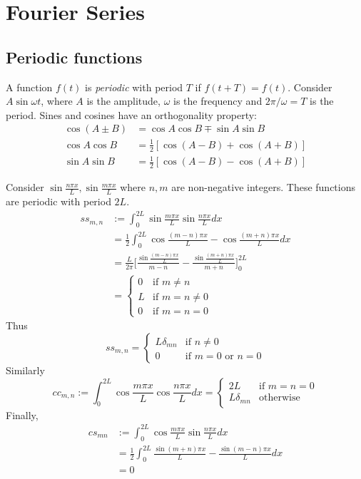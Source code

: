 \documentclass[a4paper]{article}
\begin{document}


\tableofcontents


\section{Fourier Series}

\subsection{Periodic functions}

A function $f(t)$ is \emph{periodic} with period $T$ if $f(t+T) = f(t)$. Consider $A \sin\omega t$, where $A$ is the amplitude, $\omega$ is the frequency and $2\pi/\omega=T$ is the period. Sines and cosines have an orthogonality property:
\begin{align*}
  \cos(A\pm B) &= \cos A\cos B \mp \sin A\sin B \\
  \cos A \cos B &= \frac{1}{2}[\cos(A-B)+\cos(A+B)] \\
  \sin A \sin B &= \frac{1}{2}[\cos(A-B)-\cos(A+B)]
\end{align*}

Consider $\sin\frac{n\pi x}{L}, \sin\frac{m\pi x}{L}$ where $n,m$ are non-negative integers. These functions are periodic with period $2L$.
\begin{align*}
  ss_{m,n} &:= \int_0^{2L}\sin\frac{m\pi x}{L}\sin\frac{n\pi x}{L} dx \\
  &= \frac{1}{2}\int_0^{2L}\cos\frac{(m-n)\pi x}{L} - \cos\frac{(m+n)\pi x}{L} dx \\
          &= \frac{L}{2\pi}\Bigg[\frac{\sin\frac{(m-n)\pi x}{L}}{m-n} - \frac{\sin\frac{(m+n)\pi x}{L}}{m+n}\Bigg]_0^{2L}\\
           &=
             \begin{cases}
               0 & \text{if } m\neq n \\
               L & \text{if } m=n\neq 0 \\
               0 & \text{if } m=n=0
             \end{cases}
\end{align*}
Thus
\[
  ss_{m,n}=
  \begin{cases}
    L \delta_{mn} &\text{if } n\neq 0 \\
    0 &\text{if } m=0 \text{ or } n=0
  \end{cases}
\]
Similarly
\[
  cc_{m,n} := \int_0^{2L}\cos\frac{m\pi x}{L}\cos\frac{n\pi x}{L} dx =
  \begin{cases}
    2L &\text{if } m=n=0 \\
    L\delta_{mn} &\text{otherwise}
  \end{cases}
\]
Finally,
\begin{align*}
  cs_{mn} &:= \int_0^{2L}\cos\frac{m\pi x}{L}\sin\frac{n\pi x}{L} dx \\
          &= \frac{1}{2}\int_0^{2L}\frac{\sin (m+n)\pi x}{L} - \frac{\sin (m-n)\pi x}{L} dx \\
          &= 0
\end{align*}
\end{document}
